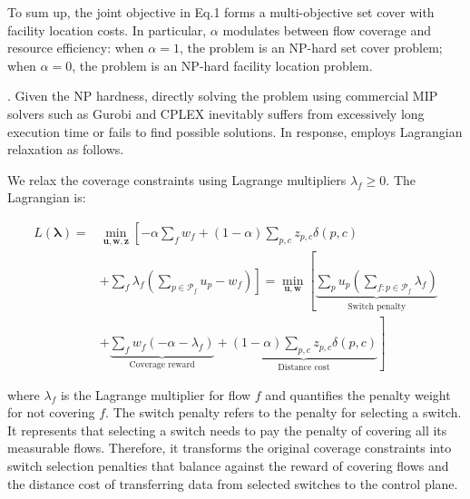 To sum up, the joint objective in Eq.1 forms a multi-objective set cover with facility location costs. In particular, $\alpha$ modulates between flow coverage and resource efficiency: when $\alpha=1$, the problem is an NP-hard set cover problem; when $\alpha=0$, the problem is an NP-hard facility location problem.  

. Given the NP hardness, directly solving the problem using commercial MIP solvers such as Gurobi \cite{gurobi} and CPLEX \cite{cplex} inevitably suffers from excessively long execution time or fails to find possible solutions. In response, \sysname employs Lagrangian relaxation as follows.

We relax the coverage constraints using Lagrange multipliers \(\lambda_f \geq 0\). The Lagrangian is:

\vspace{-10pt}
{\footnotesize
\begin{align}
L(\boldsymbol{\lambda}) = &\min_{\mathbf{u},\mathbf{w},\mathbf{z}} \left[ 
-\alpha \sum_{f} w_f + (1-\alpha) \sum_{p,c} z_{p,c} \delta(p,c) \right. \nonumber \\ &\left. + \sum_{f} \lambda_f \left( \sum_{p \in \mathcal{P}_f} u_p - w_f \right)
\right] 
= \min_{\mathbf{u},\mathbf{w}} \left[ 
\underbrace{\sum_{p} u_p \left( \sum_{f: p \in \mathcal{P}_f} \lambda_f \right)}_{\text{Switch penalty}} \right. \nonumber \\ &+ \left.
\underbrace{\sum_{f} w_f (-\alpha - \lambda_f)}_{\text{Coverage reward}} +
\underbrace{(1-\alpha) \sum_{p,c} z_{p,c} \delta(p,c)}_{\text{Distance cost}}
\right]
\end{align}}
\vspace{-7pt}

\noindent where $\lambda_f$ is the Lagrange multiplier for flow $f$ and quantifies the penalty weight for not covering $f$. The switch penalty refers to the penalty for selecting a switch. It represents that selecting a switch needs to pay the penalty of covering all its measurable flows. Therefore, it transforms the original coverage constraints into switch selection penalties that balance against the reward of covering flows and the distance cost of transferring data from selected switches to the control plane. 

